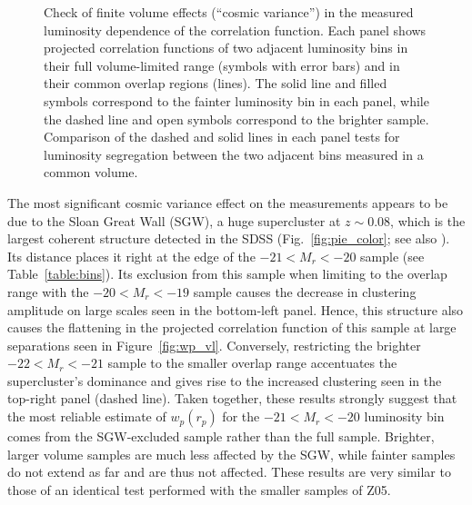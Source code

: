 \documentclass[]{emulateapj}
\newcommand{\wrp}{{w_p(r_p)}}
\begin{document}
\begin{figure*}[tbp]
\caption[]{\label{fig:wp_vl_z}
Check of finite volume effects (``cosmic variance'')
in the measured luminosity dependence of
the correlation function. Each panel shows projected correlation functions 
of two adjacent luminosity bins in their full volume-limited range 
(symbols with error bars) and in their common overlap regions (lines). 
The solid line and filled symbols correspond to the fainter luminosity
bin in each panel,  while the dashed line and open symbols correspond
to the brighter sample.
Comparison of the dashed and solid lines in each panel tests for luminosity
segregation between the two adjacent bins measured in a common volume.
}
\end{figure*}

The most significant cosmic variance effect on the measurements appears 
to be due to the Sloan Great Wall (SGW), a huge supercluster at $z \sim 0.08$, 
which is the largest coherent structure detected in the SDSS 
(Fig.~\ref{fig:pie_color}; see also \citealt{gott05}). Its 
distance places it right at the edge of the $-21<M_r<-20$ sample 
(see Table~\ref{table:bins}). Its exclusion from this sample when limiting 
to the overlap range with the $-20<M_r<-19$ sample causes the decrease in 
clustering amplitude on large scales seen in the bottom-left panel. Hence, 
this structure also causes
the flattening in the projected correlation function of this sample 
at large separations seen in Figure~\ref{fig:wp_vl}. Conversely, restricting 
the brighter $-22<M_r<-21$  sample to the smaller overlap range accentuates 
the supercluster's dominance and gives rise to the increased clustering seen 
in the top-right panel (dashed line). 
Taken together, these results strongly suggest that the most reliable
estimate of $\wrp$ for the $-21<M_r<-20$ luminosity bin comes from the
SGW-excluded sample rather than the full sample.
Brighter, larger volume samples are much less affected by the SGW,
while fainter samples do 
not extend as far and are thus not affected. These results are very similar 
to those of an identical test performed with the smaller samples of Z05. 
\end{document}
